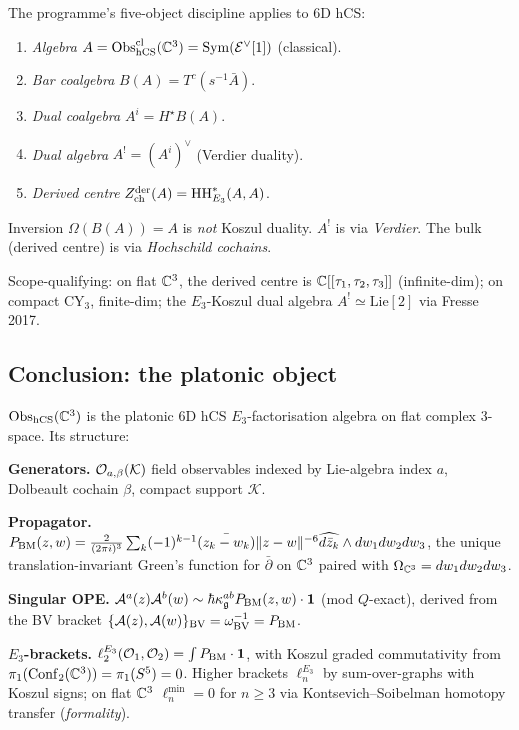 \begin{proposition}\ClaimStatusProposition
\label{opus12:prop:cache-five}
The programme's five-object discipline applies to 6D hCS:
\begin{enumerate}
\item \emph{Algebra} $A = \mathrm{Obs}^{\mathrm{cl}}_{\mathrm{hCS}}(\mathbb{C}^3) =
\mathrm{Sym}(\mathcal{E}^\vee[1])$ (classical).
\item \emph{Bar coalgebra} $B(A) = T^c(s^{-1} \bar A)$.
\item \emph{Dual coalgebra} $A^i = H^\star B(A)$.
\item \emph{Dual algebra} $A^! = (A^i)^\vee$ (Verdier duality).
\item \emph{Derived centre} $Z^{\mathrm{der}}_{\mathrm{ch}}(A) =
\mathrm{HH}^*_{E_3}(A, A)$.
\end{enumerate}
Inversion $\Omega(B(A)) = A$ is \emph{not} Koszul duality. $A^!$ is
via \emph{Verdier}. The bulk (derived centre) is via
\emph{Hochschild cochains}.

Scope-qualifying: on flat $\mathbb{C}^3$, the derived centre is
$\mathbb{C}[[\tau_1, \tau_2, \tau_3]]$ (infinite-dim); on compact CY$_3$,
finite-dim; the $E_3$-Koszul dual algebra $A^! \simeq \mathrm{Lie}[2]$
via Fresse 2017.
\end{proposition}

\subsection{Conclusion: the platonic object}
\label{opus12:sec:conclusion}

$\mathrm{Obs}_{\mathrm{hCS}}(\mathbb{C}^3)$ is the platonic 6D hCS $E_3$-factorisation
algebra on flat complex 3-space. Its structure:

\textbf{Generators.} $\mathcal{O}_{a, \beta}(\mathcal K)$ field observables
indexed by Lie-algebra index $a$, Dolbeault cochain $\beta$, compact
support $\mathcal K$.

\textbf{Propagator.} $P_{\mathrm{BM}}(z, w) = \frac{2}{(2\pi i)^3} \sum_k
(-1)^{k-1} \bar{(z_k - w_k)} \|z - w\|^{-6} \widehat{d\bar z_k}
\wedge dw_1 dw_2 dw_3$, the unique translation-invariant Green's
function for $\bar\partial$ on $\mathbb{C}^3$ paired with
$\Omega_{\mathbb{C}^3} = dw_1 dw_2 dw_3$.

\textbf{Singular OPE.} $\mathcal{A}^a(z) \mathcal{A}^b(w) \sim \hbar \kappa^{ab}_{\mathfrak{g}}
P_{\mathrm{BM}}(z, w) \cdot \mathbf{1}$ (mod $Q$-exact), derived from the
BV bracket $\{\mathcal{A}(z), \mathcal{A}(w)\}_{\mathrm{BV}} = \omega^{-1}_{\mathrm{BV}} =
P_{\mathrm{BM}}$.

\textbf{$E_3$-brackets.} $\ell_2^{E_3}(\mathcal{O}_1, \mathcal{O}_2) = \int
P_{\mathrm{BM}} \cdot \mathbf{1}$, with Koszul graded commutativity from
$\pi_1(\mathrm{Conf}_2(\mathbb{C}^3)) = \pi_1(S^5) = 0$. Higher brackets
$\ell_n^{E_3}$ by sum-over-graphs with Koszul signs; on flat $\mathbb{C}^3$
$\ell_n^{\min} = 0$ for $n \ge 3$ via Kontsevich--Soibelman
homotopy transfer (\emph{formality}).


